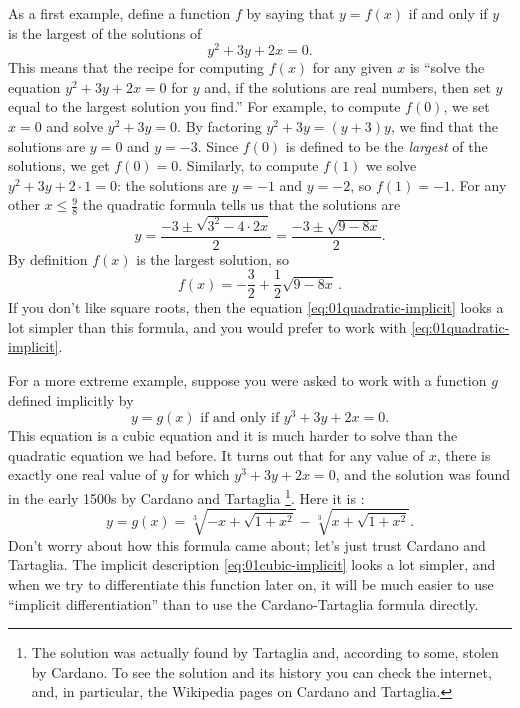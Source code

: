 As a first example, define a function $f$ by saying that $y=f(x)$ if
and only if $y$ is the largest of the solutions of
\begin{equation}\label{eq:01quadratic-implicit}
  y^2+3y+2x = 0.
\end{equation}
This means that the recipe for computing $f(x)$ for any given $x$ is ``solve the
equation $y^2+3y+2x = 0$ for $y$ and, if the solutions are real numbers, then
set $y$ equal to the largest solution you find.''  For example, to compute
$f(0)$, we set $x=0$ and solve $y^2+3y=0$.  By factoring $y^2+3y = (y+3)y$, we
find that the solutions are $y=0$ and $y=-3$.  Since $f(0)$ is defined to be the
\textit{largest} of the solutions, we get $f(0)=0$.  Similarly, to compute
$f(1)$ we solve $y^2+3y +2\cdot1=0$: the solutions are $y=-1$ and $y=-2$, so
$f(1) = -1 $.  For any other $x\leq \frac{9}{8}$ the quadratic formula tells us
that the solutions are
\[
  y = \frac{-3 \pm \sqrt{3^2-4\cdot 2x}} {2} = \frac{-3\pm\sqrt{9-8x}} {2}.
\]
By definition $f(x)$ is the largest solution, so
\[
  f(x) = -\frac{3} {2} + \frac{1} {2}\sqrt{9-8x} \, .
\]
If you don't like square roots, then the equation
\eqref{eq:01quadratic-implicit} looks a lot simpler than this formula,
and you would prefer to work with \eqref{eq:01quadratic-implicit}.



For a more extreme example, suppose you were asked to work with a
function $g$ defined implicitly by
\begin{equation}\label{eq:01cubic-implicit}
  y=g(x) \text{ if and only if } y^3+3y+2x = 0.
\end{equation}
This equation is a cubic equation and it is much harder to solve than the
quadratic equation we had before.  It turns out that for any value of $x$, there
is exactly one real value of $y$ for which $y^3+3y+2x=0$, and the solution was
found in the early 1500s by Cardano and Tartaglia \footnote{The solution was
actually found by Tartaglia and, according to some, stolen by Cardano.  To see
the solution and its history you can check the internet, and, in particular, the
Wikipedia pages on Cardano and Tartaglia.}.  Here it is :
\[
  y = g(x) = \sqrt[3]{-x+\sqrt{1+x^2}}-\sqrt[3]{x+\sqrt{1+x^2}}.
\]
Don't worry about how this formula came about; let's just trust
Cardano and Tartaglia.  The implicit description
\eqref{eq:01cubic-implicit} looks a lot simpler, and when we try to
differentiate this function later on, it will be much easier to use
``implicit differentiation'' than to use the Cardano-Tartaglia formula
directly.

